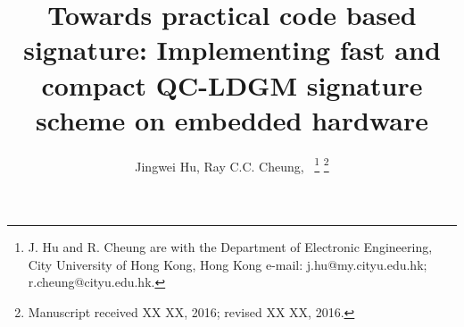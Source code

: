 \documentclass[10pt,journal,compsoc]{IEEEtran}
\begin{document}
%
\title{Towards practical code based signature: Implementing fast and compact QC-LDGM signature scheme on embedded hardware}
%
%
%
%
\author{Jingwei Hu, Ray C.C. Cheung,~
\thanks{J. Hu and R. Cheung are with the Department
of Electronic Engineering, City University of Hong Kong, Hong Kong e-mail: j.hu@my.cityu.edu.hk; r.cheung@cityu.edu.hk.}
\thanks{Manuscript received XX XX, 2016; revised XX XX, 2016.}
}

%
%
\end{document}
